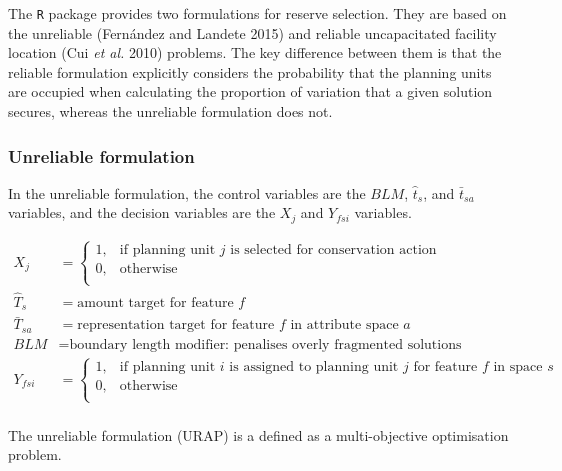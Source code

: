 \documentclass[11pt,]{article}
\begin{document}
The \texttt{R} package provides two formulations for reserve selection.
They are based on the unreliable (Fernández and Landete 2015) and
reliable uncapacitated facility location (Cui \emph{et al.} 2010)
problems. The key difference between them is that the reliable
formulation explicitly considers the probability that the planning units
are occupied when calculating the proportion of variation that a given
solution secures, whereas the unreliable formulation does not.

\subsubsection{Unreliable formulation}\label{unreliable-formulation}

In the unreliable formulation, the control variables are the $BLM$,
$\hat{t}_{s}$, and $\bar{t}_{sa}$ variables, and the decision variables
are the $X_j$ and $Y_{fsi}$ variables.

\begin{align*}
X_j
    &= \begin{cases}
        1, & \text{if planning unit $j$ is selected for conservation action} \tag{1a} \\
        0, & \text{otherwise} \\
    \end{cases} \\
%
\hat{T}_s &= \text{amount target for feature $f$} \tag{1b}\\
%
\bar{T}_{sa} &= \text{representation target for feature $f$ in attribute space $a$} \tag{1c}\\
%
BLM &= \text{boundary length modifier: penalises overly fragmented solutions} \tag{1d}\\
Y_{fsi} &= \begin{cases}
        1, & \text{if planning unit $i$ is assigned to planning unit $j$ for feature $f$ in space $s$} \tag{1e} \\
        0, & \text{otherwise} \\
    \end{cases} \\
\end{align*}

The unreliable formulation (URAP) is a defined as a multi-objective
optimisation problem.
\end{document}

